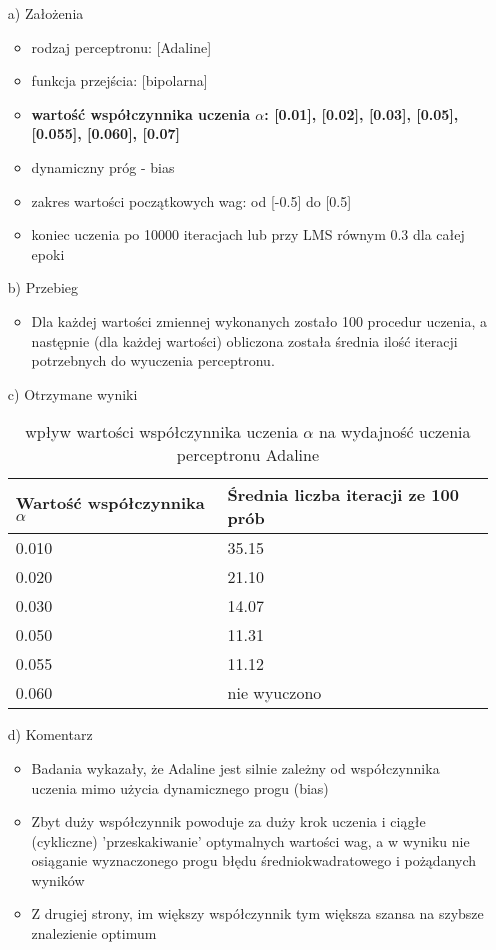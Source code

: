 \documentclass[17pt]{article}
\begin{document}
\begin{enumerate}

\item[a)] Założenia

\begin{itemize}
\item rodzaj perceptronu: [Adaline]
\item funkcja przejścia: [bipolarna]
\item \textbf{wartość współczynnika uczenia $\alpha$: [0.01], [0.02], [0.03], [0.05], [0.055], [0.060], [0.07]}
\item dynamiczny próg - bias
\item zakres wartości początkowych wag: od [-0.5] do [0.5]
\item koniec uczenia po 10000 iteracjach lub przy LMS równym 0.3 dla całej epoki
\end{itemize}
\newpage
\item[b)] Przebieg

\begin{itemize}
\item Dla każdej wartości zmiennej wykonanych zostało 100 procedur uczenia, a następnie (dla każdej wartości) obliczona została średnia ilość iteracji potrzebnych do wyuczenia perceptronu.
\end{itemize}
\item[c)] Otrzymane wyniki

\begin{table}[ht]
\centering
\begin{tabular}{|p{4cm}|p{4cm}|}
 \hline
 Wartość współczynnika $\alpha$ & Średnia liczba iteracji ze 100 prób\\ \hline
 0.010 & 35.15\\ 
 0.020 & 21.10\\ 
 0.030 & 14.07\\ 
 0.050 & 11.31\\ 
 0.055 & 11.12\\ 
 0.060 & nie wyuczono\\ 
 \hline
\end{tabular}
\caption{\label{tab:table6}wpływ wartości współczynnika uczenia $\alpha$ na wydajność uczenia perceptronu Adaline}
\end{table}

\item[d)] Komentarz


\begin{itemize}
\item Badania wykazały, że Adaline jest silnie zależny od współczynnika uczenia mimo użycia dynamicznego progu (bias)
\item Zbyt duży współczynnik powoduje za duży krok uczenia i ciągłe (cykliczne) 'przeskakiwanie' optymalnych wartości wag, a w wyniku nie osiąganie wyznaczonego progu błędu średniokwadratowego i pożądanych wyników
\item Z drugiej strony, im większy współczynnik tym większa szansa na szybsze znalezienie optimum
\end{itemize}


\end{enumerate}
\end{document}
